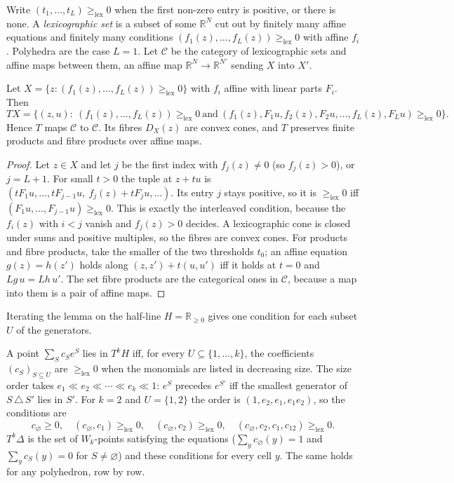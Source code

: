 \documentclass[11pt]{article}
\theoremstyle{definition}\newtheorem{definition}[theorem]{Definition}\newtheorem{remark}[theorem]{Remark}\newtheorem{example}[theorem]{Example}
\newcommand{\R}{\mathbb R}\newcommand{\X}{\mathbb X}\newcommand{\C}{\mathcal C}
\newcommand{\lex}{\ge_{\mathrm{lex}}}
\begin{document}
Write $(t_1,\dots,t_L)\lex0$ when the first non-zero entry is positive, or there is none. A \emph{lexicographic set} is a subset of some
$\R^N$ cut out by finitely many affine equations and finitely many conditions $(f_1(z),\dots,f_L(z))\lex0$ with affine $f_i$. Polyhedra are
the case $L=1$. Let $\C$ be the category of lexicographic sets and affine maps between them, an affine map $\R^N\to\R^{N'}$ sending $X$
into $X'$.

\begin{lemma}[interleaving]\label{lem:interleave}
Let $X=\{z:(f_1(z),\dots,f_L(z))\lex0\}$ with $f_i$ affine with linear parts $F_i$. Then
\[
TX=\bigl\{(z,u):\ (f_1(z),\dots,f_L(z))\lex0\ \text{and}\ (f_1(z),F_1u,f_2(z),F_2u,\dots,f_L(z),F_Lu)\lex0\bigr\}.
\]
Hence $T$ maps $\C$ to $\C$. Its fibres $D_X(z)$ are convex cones, and $T$ preserves finite products and fibre products over affine maps.
\end{lemma}

\begin{proof}
Let $z\in X$ and let $j$ be the first index with $f_j(z)\ne0$ (so $f_j(z)>0$), or $j=L+1$. For small $t>0$ the tuple at $z+tu$ is
$(tF_1u,\dots,tF_{j-1}u,\ f_j(z)+tF_ju,\dots)$. Its entry $j$ stays positive, so it is $\lex0$ iff $(F_1u,\dots,F_{j-1}u)\lex0$.
This is exactly the interleaved condition, because the $f_i(z)$ with $i<j$ vanish and $f_j(z)>0$ decides. A lexicographic cone is
closed under sums and positive multiples, so the fibres are convex cones. For products and fibre products, take the smaller of the two
thresholds $t_0$; an affine equation $g(z)=h(z')$ holds along $(z,z')+t(u,u')$ iff it holds at $t=0$ and $Lg\,u=Lh\,u'$. The set fibre
products are the categorical ones in $\C$, because a map into them is a pair of affine maps.
\end{proof}

Iterating the lemma on the half-line $H=\R_{\ge0}$ gives one condition for each subset $U$ of the generators.

\begin{lemma}\label{lem:lex}
A point $\sum_Sc_Se^S$ lies in $T^kH$ iff, for every $U\subseteq\{1,\dots,k\}$, the coefficients $(c_S)_{S\subseteq U}$ are
$\lex0$ when the monomials are listed in decreasing size. The size order takes $e_1\ll e_2\ll\cdots\ll e_k\ll1$: $e^S$ precedes $e^{S'}$
iff the smallest generator of $S\,\triangle\,S'$ lies in $S'$. For $k=2$ and $U=\{1,2\}$ the order is $(1,e_2,e_1,e_1e_2)$, so the conditions
are
\[
c_\varnothing\ge0,\quad(c_\varnothing,c_1)\lex0,\quad(c_\varnothing,c_2)\lex0,\quad(c_\varnothing,c_2,c_1,c_{12})\lex0 .
\]
$T^k\Delta$ is the set of $W_k$-points satisfying the equations ($\sum_yc_\varnothing(y)=1$ and $\sum_yc_S(y)=0$ for $S\ne\varnothing$)
and these conditions for every cell $y$. The same holds for any polyhedron, row by row.
\end{lemma}
\end{document}
